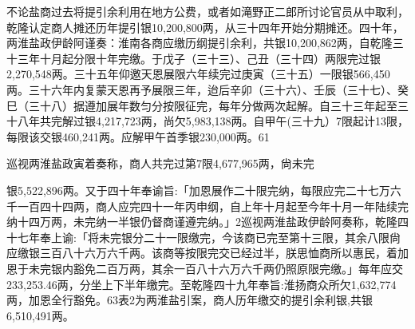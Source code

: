 不论盐商过去将提引余利用在地方公费，或者如滝野正二郎所讨论官员从中取利，乾隆认定商人摊还历年提引银10,200,800两，从三十四年开始分期摊还。四十年，两淮盐政伊龄阿谨奏：淮南各商应缴历纲提引余利，共银10,200,862两，自乾隆三十三年十月起分限十年完缴。于戊子（三十三）、己丑（三十四）两限完过银2,270,548两。三十五年仰邀天恩展限六年续完过庚寅（三十五）一限银566,450两。三十六年内复蒙天恩再予展限三年，迨后辛卯（三十六）、壬辰（三十七）、癸巳（三十八）据遵加展年数匀分按限征完，每年分做两次起解。自三十三年起至三十八年共完解过银4,217,723两，尚欠5,983,138两。自甲午(三十九）7限起计13限，每限该交银460,241两。应解甲午首季银230,000两。61

巡视两淮盐政寅着奏称，商人共完过第7限4,677,965两，尙未完

\vfill
\begin{BookNotes}
\end{BookNotes}

\noindent 银5,522,896两。又于四十年奉谕旨:「加恩展作二十限完纳，每限应完二十七万六千一百四十四两，商人应完四十一年丙申纲，自上年十月起至今年十月一年陆续完纳十四万两，未完纳一半银仍督商谨遵完纳。」2巡视两淮盐政伊龄阿奏称，乾隆四十七年奉上谕:「将未完银分二十一限缴完，今该商已完至第十三限，其余八限尙应缴银三百八十六万六千两。该商等按限完交已经过半，朕思恤商所以惠民，着加恩于未完银内豁免二百万两，其余一百八十六万六千两仍照原限完缴。」每年应交233,253.46两，分坐上下半年缴完。至乾隆四十九年奉旨:淮扬商众所欠1,632,774两，加恩全行豁免。63表2为两淮盐引案，商人历年缴交的提引余利银,共银6,510,491两。


\vfill
\begin{BookNotes}
\end{BookNotes}


